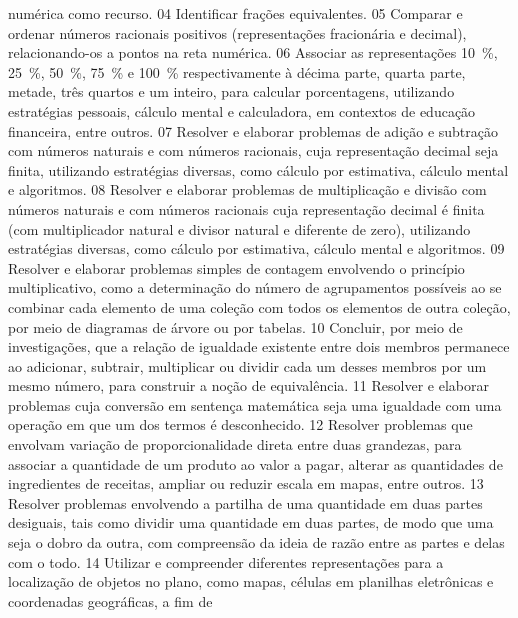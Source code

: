 {{{				numérica como recurso.
			}
			{04}{%
				Identificar frações equivalentes.
			}
			{05}{%
				Comparar e ordenar números racionais positivos (representações fracionária e
				decimal), relacionando-os a pontos na reta numérica.
			}
			{06}{%
        Associar as representações \qty{10}{\percent}{\percent}, \qty{25}{\percent}, \qty{50}{\percent}, \qty{75}{\percent} e \qty{100}{\percent} respectivamente à
				décima parte, quarta parte, metade, três quartos e um inteiro, para calcular porcentagens,
				utilizando estratégias pessoais, cálculo mental e calculadora, em contextos de educação
				financeira, entre outros.
			}
			{07}{%
				Resolver e elaborar problemas de adição e subtração com números naturais e
				com números racionais, cuja representação decimal seja finita, utilizando estratégias diversas,
				como cálculo por estimativa, cálculo mental e algoritmos.
			}
			{08}{%
				Resolver e elaborar problemas de multiplicação e divisão com números naturais e
				com números racionais cuja representação decimal é finita (com multiplicador natural e divisor
				natural e diferente de zero), utilizando estratégias diversas, como cálculo por estimativa,
				cálculo mental e algoritmos.
			}
			{09}{%
				Resolver e elaborar problemas simples de contagem envolvendo o princípio
				multiplicativo, como a determinação do número de agrupamentos possíveis ao se combinar
				cada elemento de uma coleção com todos os elementos de outra coleção, por meio de
				diagramas de árvore ou por tabelas.
			}
			{10}{%
				Concluir, por meio de investigações, que a relação de igualdade existente
				entre dois membros permanece ao adicionar, subtrair, multiplicar ou dividir cada um desses
				membros por um mesmo número, para construir a noção de equivalência.
			}
			{11}{%
				Resolver e elaborar problemas cuja conversão em sentença matemática seja uma
				igualdade com uma operação em que um dos termos é desconhecido.
			}
			{12}{%
				Resolver problemas que envolvam variação de proporcionalidade direta entre
				duas grandezas, para associar a quantidade de um produto ao valor a pagar, alterar as
				quantidades de ingredientes de receitas, ampliar ou reduzir escala em mapas, entre outros.
			}
			{13}{%
				Resolver problemas envolvendo a partilha de uma quantidade em duas partes
				desiguais, tais como dividir uma quantidade em duas partes, de modo que uma seja o dobro
				da outra, com compreensão da ideia de razão entre as partes e delas com o todo.
			}
			{14}{%
				Utilizar e compreender diferentes representações para a localização de objetos
				no plano, como mapas, células em planilhas eletrônicas e coordenadas geográficas, a fim de
}}}
